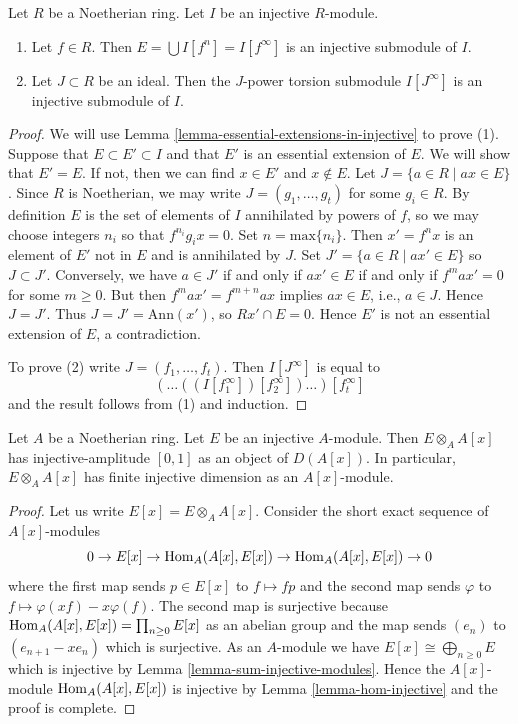 \begin{lemma}
\label{lemma-injective-module-divide}
Let $R$ be a Noetherian ring. Let $I$ be an injective $R$-module.
\begin{enumerate}
\item Let $f \in R$. Then $E = \bigcup I[f^n] = I[f^\infty]$
is an injective submodule of $I$.
\item Let $J \subset R$ be an ideal. Then the $J$-power torsion
submodule $I[J^\infty]$ is an injective submodule of $I$.
\end{enumerate}
\end{lemma}

\begin{proof}
We will use Lemma \ref{lemma-essential-extensions-in-injective}
to prove (1).
Suppose that $E \subset E' \subset I$ and that $E'$ is an essential
extension of $E$. We will show that $E' = E$. If not, then we can
find $x \in E'$ and $x \not \in E$.
Let $J = \{ a \in R \mid ax \in E\}$. Since $R$ is Noetherian,
we may write $J = (g_1, \ldots, g_t)$ for some
$g_i \in R$. By definition $E$ is the set of elements of $I$ annihilated
by powers of $f$, so we may choose integers $n_i$ so that $f^{n_i}g_ix = 0$.
Set $n = \mathrm{max}\{ n_i \}$. Then $x' = f^n x$ is an element of $E'$
not in $E$ and is annihilated by $J$. Set $J' = \{ a \in R \mid ax' \in E \}$
so $J \subset J'$. Conversely, we have $a \in J'$ if and only if $ax' \in E$
if and only if $f^m a x' = 0$ for some $m \geq 0$. But then
$f^m a x' = f^{m + n} a x$ implies $ax \in E$, i.e., $a \in J$.
Hence $J = J'$. Thus $J = J' = \text{Ann}(x')$, so $Rx' \cap E  = 0$.
Hence $E'$ is not an essential extension of $E$, a contradiction.

\medskip\noindent
To prove (2) write $J = (f_1, \ldots, f_t)$. Then
$I[J^\infty]$ is equal to
$$
(\ldots((I[f_1^\infty])[f_2^\infty])\ldots)[f_t^\infty]
$$
and the result follows from (1) and induction.
\end{proof}

\begin{lemma}
\label{lemma-injective-dimension-over-polynomial-ring}
Let $A$ be a Noetherian ring. Let $E$ be an injective $A$-module.
Then $E \otimes_A A[x]$ has injective-amplitude $[0, 1]$
as an object of $D(A[x])$. In particular, $E \otimes_A A[x]$
has finite injective dimension as an $A[x]$-module.
\end{lemma}

\begin{proof}
Let us write $E[x] = E \otimes_A A[x]$. Consider the short exact
sequence of $A[x]$-modules
$$
0 \to E[x] \to \mathop{\mathrm{Hom}}\nolimits_A(A[x], E[x]) \to \mathop{\mathrm{Hom}}\nolimits_A(A[x], E[x]) \to 0
$$
where the first map sends $p \in E[x]$ to $f \mapsto fp$ and the
second map sends $\varphi$ to $f \mapsto \varphi(xf) - x\varphi(f)$.
The second map is surjective because
$\mathop{\mathrm{Hom}}\nolimits_A(A[x], E[x]) = \prod_{n \geq 0} E[x]$ as an abelian group and
the map sends $(e_n)$ to $(e_{n + 1} - xe_n)$ which is surjective.
As an $A$-module we have $E[x] \cong \bigoplus_{n \geq 0} E$
which is injective by Lemma \ref{lemma-sum-injective-modules}.
Hence the $A[x]$-module $\mathop{\mathrm{Hom}}\nolimits_A(A[x], E[x])$ is injective by
Lemma \ref{lemma-hom-injective} and the proof is complete.
\end{proof}



